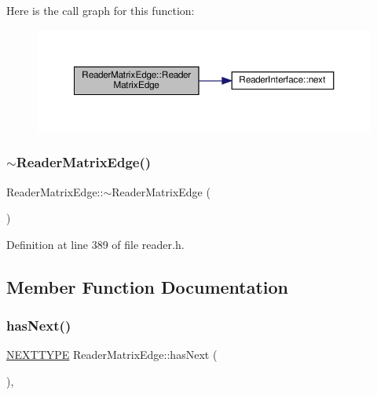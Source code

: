 Here is the call graph for this function\+:
\nopagebreak
\begin{figure}[H]
\begin{center}
\leavevmode
\includegraphics[width=350pt]{classReaderMatrixEdge_a8bb3d1f9b91410abcfc2bc1c3becea5c_cgraph}
\end{center}
\end{figure}
\mbox{\label{classReaderMatrixEdge_ae6a8f85585a25e38164c2bf8ec18c9b8}} 
\subsubsection{\texorpdfstring{$\sim$\+Reader\+Matrix\+Edge()}{~ReaderMatrixEdge()}}
{\footnotesize\ttfamily Reader\+Matrix\+Edge\+::$\sim$\+Reader\+Matrix\+Edge (\begin{DoxyParamCaption}{ }\end{DoxyParamCaption})\hspace{0.3cm}{\ttfamily [inline]}}



Definition at line 389 of file reader.\+h.



\subsection{Member Function Documentation}
\mbox{\label{classReaderMatrixEdge_a61598aded2eab7ef2024636a5381423b}} 
\subsubsection{\texorpdfstring{has\+Next()}{hasNext()}}
{\footnotesize\ttfamily \hyperlink{classReaderInterface_ac2420ec8d2f60feadf2533d4fa77ec5e}{N\+E\+X\+T\+T\+Y\+PE} Reader\+Matrix\+Edge\+::has\+Next (\begin{DoxyParamCaption}{ }\end{DoxyParamCaption})\hspace{0.3cm}{\ttfamily [inline]}, {\ttfamily [virtual]}}

